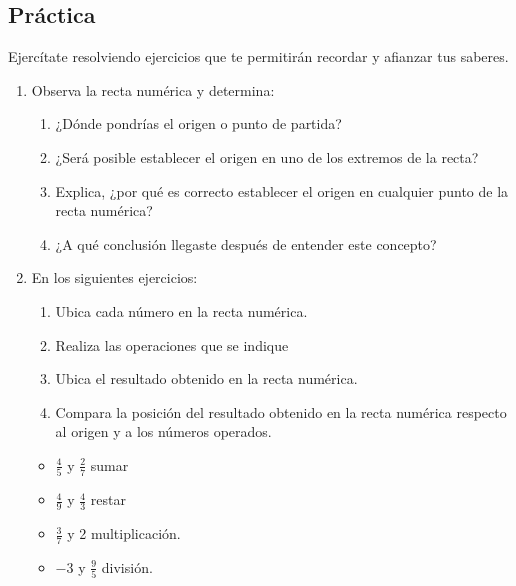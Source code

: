 \documentclass[12pt,a4paper]{article}
\begin{document}
\subsection*{Práctica}

Ejercítate resolviendo ejercicios que te permitirán recordar y afianzar tus saberes.

\begin{enumerate}
    \item Observa la recta numérica y determina:

    \begin{center}
    \end{center}

    \begin{enumerate}[label=\alph*)]
        \item ¿Dónde pondrías el origen o punto de partida?
        \item ¿Será posible establecer el origen en uno de los extremos de la recta?
        \item Explica, ¿por qué es correcto establecer el origen en cualquier punto de la recta numérica?
        \item ¿A qué conclusión llegaste después de entender este concepto?
    \end{enumerate}

    \item En los siguientes ejercicios:

        \begin{enumerate}[label=\alph*)]
            \item Ubica cada número en la recta numérica.
            \item Realiza las operaciones que se indique
            \item Ubica el resultado obtenido en la recta numérica.
            \item Compara la posición del resultado obtenido en la recta numérica respecto al origen y a los números operados.
        \end{enumerate}

        \begin{itemize}
            \item $\frac{4}{5}$ y $\frac{2}{7}$ sumar
            \item $\frac{4}{9}$ y $\frac{4}{3}$ restar
            \item $\frac{3}{7}$ y 2 multiplicación.
            \item $-3$ y $\frac{9}{5}$ división.
        \end{itemize}


\end{enumerate}
\end{document}
